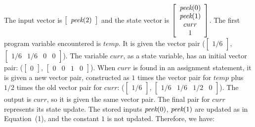 \noindent The input vector is $\left [\begin{array} {c} \mbox{\it peek}(2) \end{array}
\right]$ and the state vector is $\left [\begin{array} {c} \mbox{\it peek}(0) \\ \mbox{\it peek}(1) \\ curr \\ 1 \end{array} \right]$. The first program
variable encountered is $temp$. It is given the vector pair ($\left [
\begin{array} {c} 1/6 \end{array} \right ]$, $\left [
\begin{array} {cccc} 1/6 & 1/6 & 0 & 0 \end{array} \right ]$). The
variable $curr$, as a state variable, has an initial vector pair:
($\left [ \begin{array} {c} 0 \end{array} \right ]$, $\left
[\begin{array} {cccc} 0 & 0 & 1 & 0
\end{array} \right ]$). When $curr$ is found in an assignment
statement, it is given a new vector pair, constructed as $1$ times
the vector pair for $temp$ plus $1/2$ times the old vector pair
for $curr$: ($\left [ \begin{array} {c} 1/6 \end{array} \right ]$,
$\left [ \begin{array} {cccc} 1/6 & 1/6 & 1/2 & 0 \end{array}
\right ]$). The output is $curr$, so it is given the same vector
pair. The final pair for $curr$ represents its state update. The
stored inputs $\mbox{\it peek}(0)$, $\mbox{\it peek}(1)$ are updated as in
Equation~(1), and the constant $1$ is not updated. Therefore, we have:
